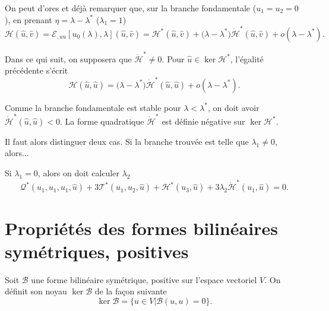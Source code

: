 \documentclass[12pt, final]{amsart}
\begin{document}
On peut d'ores et déjà remarquer que, sur la branche fondamentale
(\(u_1=u_2=0\)), en prenant \(\eta=\lambda-\lambda^\ast\) (\(\lambda_1=1\))
\begin{equation}
  \mathcal H(\hat{u}, \hat{v})
  =\mathcal E_{,uu}[u_0(\lambda), \lambda](\hat{u}, \hat{v})
  =\mathcal H^\ast(\hat{u}, \hat{v})
  +\bigl(\lambda-\lambda^\ast\bigr)\dot{\mathcal H}^\ast(\hat{u}, \hat{v})
  +o(\lambda-\lambda^\ast).
\end{equation}

Dans ce qui suit, on supposera que \(\dot{\mathcal H}^\ast\neq 0\). Pour
\(\hat{u}\in\ker\mathcal H^\ast\), l'égalité précédente s'écrit
\begin{equation}
  \mathcal H(\hat{u}, \hat{u})
  =\bigl(\lambda-\lambda^\ast\bigr)\dot{\mathcal H}^\ast(\hat{u}, \hat{u})
  +o(\lambda-\lambda^\ast).
\end{equation}

Comme la branche fondamentale est stable pour \(\lambda<\lambda^\ast\), on doit
avoir \(\dot{\mathcal H}^\ast(\hat{u}, \hat{u})<0\). La forme quadratique
\(\dot{\mathcal H}^\ast\) est définie négative sur \(\ker\mathcal H^\ast\).


Il faut alors distinguer deux cas. Si la branche trouvée est telle que
\(\lambda_1\neq0\), alors...

Si \(\lambda_1=0\), alors on doit calculer \(\lambda_2\)
\begin{equation}
  \mathcal Q^\ast(u_1, u_1, u_1, \hat{u})
  +3\mathcal T^\ast(u_1, u_2, \hat{u})+\mathcal H^\ast(u_3, \hat{u})
  +3\lambda_2\dot{\mathcal H}^\ast(u_1, \hat{u})=0.
\end{equation}

\appendix

\section{Propriétés des formes bilinéaires symétriques, positives}

Soit \(\mathcal B\) une forme bilinéaire symétrique, positive sur l'espace vectoriel
\(V\). On définit son noyau \(\ker\mathcal B\) de la façon suivante
\begin{equation}
  \ker\mathcal B=\{u\in V|\mathcal B(u, u)=0\}.
\end{equation}
\end{document}
